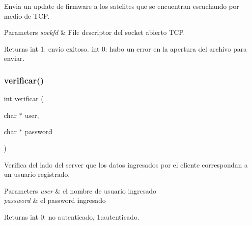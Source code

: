 Envia un update de firmware a los satelites que se encuentran escuchando por medio de T\+CP. 


\begin{DoxyParams}{Parameters}
{\em sockfd} & File descriptor del socket abierto T\+CP. \\
\hline
\end{DoxyParams}
\begin{DoxyReturn}{Returns}
int 1\+: envio exitoso. int 0\+: hubo un error en la apertura del archivo para enviar. 
\end{DoxyReturn}
\mbox{\label{server_2main_8c_a8ebfa03aaa653d8fc17a3d498a22cb40}} 
\subsubsection{verificar()}
{\footnotesize\ttfamily int verificar (\begin{DoxyParamCaption}\item[{char $\ast$}]{user,  }\item[{char $\ast$}]{password }\end{DoxyParamCaption})}



Verifica del lado del server que los datos ingresados por el cliente correspondan a un usuario registrado. 


\begin{DoxyParams}{Parameters}
{\em user} & el nombre de usuario ingresado \\
\hline
{\em password} & el password ingresado \\
\hline
\end{DoxyParams}
\begin{DoxyReturn}{Returns}
int 0\+: no autenticado, 1\+:autenticado. 
\end{DoxyReturn}
